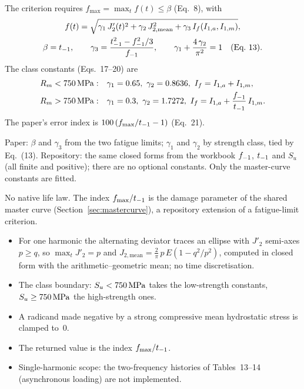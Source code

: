  The criterion requires $f_{\max}=\max_t f(t)\le\beta$ (Eq.~8), with
\begin{gather}
f(t) = \sqrt{\gamma_1\,J'_2(t)^2 + \gamma_2\,J_{2,\mathrm{mean}}^2 + \gamma_3\,I_f(I_{1,a},I_{1,m})} ,
\label{eq:vhn-main}\\
\beta = t_{-1} , \qquad \gamma_3 = \frac{t_{-1}^2 - f_{-1}^2/3}{f_{-1}} , \qquad
\gamma_1 + \frac{4\,\gamma_2}{\pi^2} = 1 \quad\text{(Eq.~13)} .
\label{eq:vhn-const}
\end{gather}
The class constants (Eqs.~17--20) are
\begin{equation}
\begin{aligned}
R_m < 750\,\mathrm{MPa} :&\quad \gamma_1 = 0.65,\ \gamma_2 = 0.8636,\ I_f = I_{1,a} + I_{1,m} ,\\
R_m > 750\,\mathrm{MPa} :&\quad \gamma_1 = 0.3,\ \gamma_2 = 1.7272,\ I_f = I_{1,a} + \frac{f_{-1}}{t_{-1}}\,I_{1,m} .
\end{aligned}
\label{eq:vhn-class}
\end{equation}
The paper's error index is $100\,(f_{\max}/t_{-1}-1)$ (Eq.~21).

 Paper: $\beta$ and $\gamma_3$ from the two fatigue limits; $\gamma_1$
and $\gamma_2$ by strength class, tied by Eq.~(13). Repository: the same closed forms from the workbook
$f_{-1}$, $t_{-1}$ and $S_u$ (all finite and positive); there are no optional constants. Only the
master-curve constants are fitted.

 No native life law. The index $f_{\max}/t_{-1}$ is the damage parameter of the shared master
curve (Section~\ref{sec:mastercurve}), a repository extension of a fatigue-limit criterion.

\begin{itemize}
\item For one harmonic the alternating deviator traces an ellipse with $J'_2$ semi-axes $p\ge q$, so
  $\max_t J'_2=p$ and $J_{2,\mathrm{mean}}=\tfrac{2}{\pi}\,p\,E(1-q^2/p^2)$, computed in closed form
  with the arithmetic--geometric mean; no time discretisation.
\item The class boundary: $S_u<750\,\mathrm{MPa}$ takes the low-strength constants, $S_u\ge750\,\mathrm{MPa}$ the
  high-strength ones.
\item A radicand made negative by a strong compressive mean hydrostatic stress is clamped to~0.
\item The returned value is the index $f_{\max}/t_{-1}$.
\item Single-harmonic scope: the two-frequency histories of Tables~13--14 (asynchronous loading) are
  not implemented.
\end{itemize}

